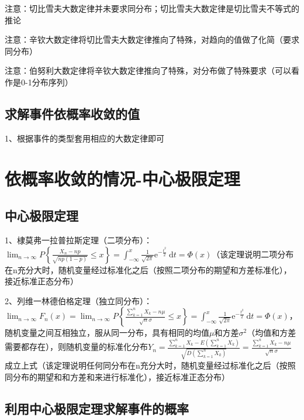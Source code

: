 注意：切比雪夫大数定律并未要求同分布；切比雪夫大数定律是切比雪夫不等式的推论

注意：辛钦大数定律将切比雪夫大数定律推向了特殊，对趋向的值做了化简（要求同分布）

注意：伯努利大数定律将辛钦大数定律推向了特殊，对分布做了特殊要求（可以看作是0-1分布序列）



\subsection{求解事件依概率收敛的值}

1、根据事件的类型套用相应的大数定律即可

\section{依概率收敛的情况-中心极限定理}



\subsection{中心极限定理}

1、棣莫弗一拉普拉斯定理（二项分布）：$\lim _{n \rightarrow \infty} P\left\{\frac{X_{n}-n p}{\sqrt{n p(1-p)}} \leqslant x\right\}=\int_{-\infty}^{x} \frac{1}{\sqrt{2 \pi}} \mathrm{e}^{-\frac{t^{2}}{2}} \mathrm{~d} t=\Phi(x)$（该定理说明二项分布在n充分大时，随机变量经过标准化之后（按照二项分布的期望和方差标准化），接近标准正态分布）

2、列维一林德伯格定理（独立同分布）：$\lim_{n \rightarrow \infty} F_{n}(x)=\lim_{n \rightarrow \infty} P\left\{\frac{\sum_{k=1}^{n} X_{k}-n \mu}{\sqrt{n} \sigma} \leqslant x\right\}=\int_{-\infty}^{x} \frac{1}{\sqrt{2 \pi}} \mathrm{e}^{-\frac{t^{2}}{2}} \mathrm{~d} t=\Phi(x)$，随机变量之间互相独立，服从同一分布，具有相同的均值$\mu$和方差$\sigma^2$（均值和方差需要都存在），则随机变量的标准化分布$Y_{n}=\frac{\sum_{k=1}^{n} X_{k}-E\left(\sum_{k=1}^{n} X_{k}\right)}{\sqrt{D\left(\sum_{k=1}^{n} X_{k}\right)}}=\frac{\sum_{k=1}^{n} X_{k}-n \mu}{\sqrt{n} \sigma}$成立上式（该定理说明任何同分布在n充分大时，随机变量经过标准化之后（按照同分布的期望和和方差和来进行标准化），接近标准正态分布）



\subsection{利用中心极限定理求解事件的概率}

